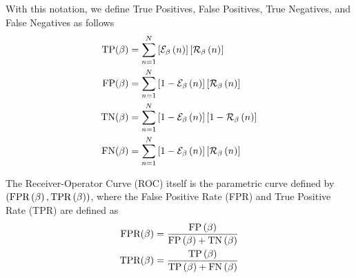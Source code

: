 %
With this notation, we define True Positives, False Positives, True Negatives, and False Negatives as follows
\begin{align}
\text{TP}(\beta)
&=
\sum_{n=1}^N 
\left[ \mathcal{E}_\beta\left( n \right) \right]
\left[ \mathcal{R}_\beta\left( n \right) \right]
\label{eq_auroc:1}
\\
\text{FP}(\beta)
&=
\sum_{n=1}^N 
\left[ 1-\mathcal{E}_\beta\left( n \right) \right]
\left[ \mathcal{R}_\beta\left( n \right) \right]
\label{eq_auroc:2}
\\
\text{TN}(\beta)
&=
\sum_{n=1}^N 
\left[ 1-\mathcal{E}_\beta\left( n \right) \right]
\left[ 1-\mathcal{R}_\beta\left( n \right) \right]
\label{eq_auroc:3}
\\
\text{FN}(\beta)
&=
\sum_{n=1}^N 
\left[ 1-\mathcal{E}_\beta\left( n \right) \right]
\left[ \mathcal{R}_\beta\left( n \right) \right]
\label{eq_auroc:4}
\end{align}

The Receiver-Operator Curve (ROC) itself is the parametric curve defined by
$\left( \text{FPR}\left( \beta \right), \text{TPR}\left( \beta \right) \right)$, where the False Positive Rate (FPR) and True Positive Rate (TPR) are defined as
\begin{align}
\text{FPR}(\beta)
&=
\frac{ \text{FP}\left( \beta \right) }{\text{FP}\left( \beta \right) + \text{TN}\left( \beta \right)}
\\
\text{TPR}(\beta)
&=
\frac{ \text{TP}\left( \beta \right) }{\text{TP}\left( \beta \right) + \text{FN}\left( \beta \right)}
\end{align}

